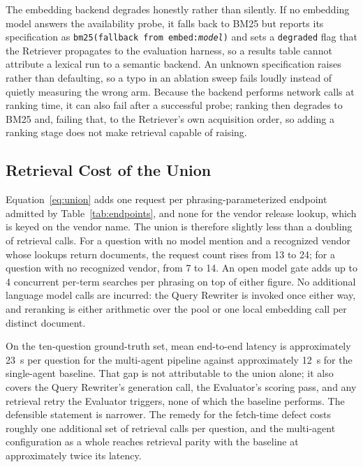 The embedding backend degrades honestly rather than silently. If no
embedding model answers the availability probe, it falls back to BM25
but reports its specification as \texttt{bm25(fallback from
embed:\textit{model})} and sets a \texttt{degraded} flag that the
Retriever propagates to the evaluation harness, so a results table
cannot attribute a lexical run to a semantic backend. An unknown
specification raises rather than defaulting, so a typo in an ablation
sweep fails loudly instead of quietly measuring the wrong arm. Because
the backend performs network calls at ranking time, it can also fail
after a successful probe; ranking then degrades to BM25 and, failing
that, to the Retriever's own acquisition order, so adding a ranking
stage does not make retrieval capable of raising.

\subsection{Retrieval Cost of the Union}\label{sec:retrieval-cost}

Equation~\eqref{eq:union} adds one request per phrasing-parameterized
endpoint admitted by Table~\ref{tab:endpoints}, and none for the vendor
release lookup, which is keyed on the vendor name. The union is
therefore slightly less than a doubling of retrieval calls. For a
question with no model mention and a recognized vendor whose lookups
return documents, the request count rises from 13 to 24; for a question
with no recognized vendor, from 7 to 14. An open model gate adds up to
4 concurrent per-term searches per phrasing on top of either figure. No
additional language model calls are incurred: the Query Rewriter is
invoked once either way, and reranking is either arithmetic over the
pool or one local embedding call per distinct document.

On the ten-question ground-truth set, mean end-to-end latency is
approximately 23~s per question for the multi-agent pipeline against
approximately 12~s for the single-agent baseline. That gap is not
attributable to the union alone; it also covers the Query Rewriter's
generation call, the Evaluator's scoring pass, and any retrieval retry
the Evaluator triggers, none of which the baseline performs. The
defensible statement is narrower. The remedy for the fetch-time defect
costs roughly one additional set of retrieval calls per question, and
the multi-agent configuration as a whole reaches retrieval parity with
the baseline at approximately twice its latency.
